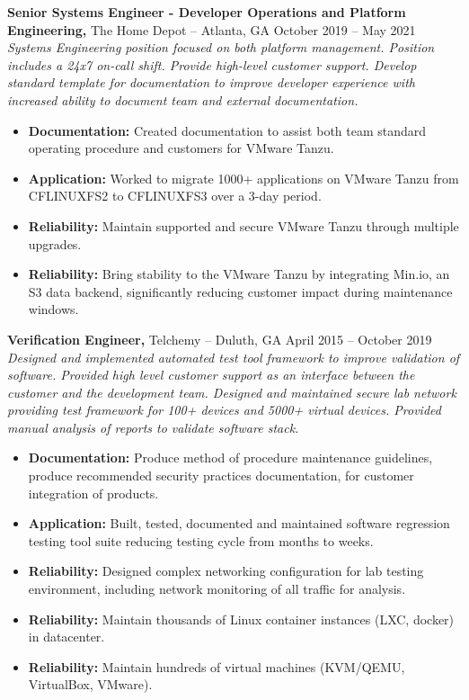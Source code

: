 \documentclass[11pt]{article}       %
\begin{document}
\textbf{Senior Systems Engineer - Developer Operations and Platform Engineering,} {The Home Depot} -- Atlanta, GA \hfill October 2019 -- May 2021 \\
\vspace{-9pt}
\textit{Systems Engineering position focused on both platform management. Position includes a 24x7 on-call shift. Provide high-level customer support. Develop standard template for documentation to improve developer experience with increased ability to document team and external documentation.}
\vspace{-4pt}
\begin{itemize}
  \item \textbf{Documentation:} Created documentation to assist both team standard operating procedure and customers for VMware Tanzu.
  \item \textbf{Application:} Worked to migrate 1000+ applications on VMware Tanzu from CFLINUXFS2 to CFLINUXFS3 over a 3-day period.
  \item \textbf{Reliability:} Maintain supported and secure VMware Tanzu through multiple upgrades.
  \item \textbf{Reliability:} Bring stability to the VMware Tanzu by integrating Min.io, an S3 data backend, significantly reducing customer impact during maintenance windows. 
\end{itemize}

\textbf{Verification Engineer,} {Telchemy} -- Duluth, GA \hfill April 2015 -- October 2019 \\
\vspace{-9pt}
\textit{Designed and implemented automated test tool framework to improve validation of software. Provided high level customer support as an interface between the customer and the development team. Designed and maintained secure lab network providing test framework for 100+ devices and 5000+ virtual devices. Provided manual analysis of reports to validate software stack.}
\vspace{-4pt}
\begin{itemize}
  \item \textbf{Documentation:} Produce method of procedure maintenance guidelines, produce recommended security practices documentation, for customer integration of products.
  \item \textbf{Application:} Built, tested, documented and maintained software regression testing tool suite reducing testing cycle from months to weeks. 
  \item \textbf{Reliability:} Designed complex networking configuration for lab testing environment, including network monitoring of all traffic for analysis.
  \item \textbf{Reliability:} Maintain thousands of Linux container instances (LXC, docker) in datacenter.
  \item \textbf{Reliability:} Maintain hundreds of virtual machines (KVM/QEMU, VirtualBox, VMware).
\end{itemize}
\end{document}

